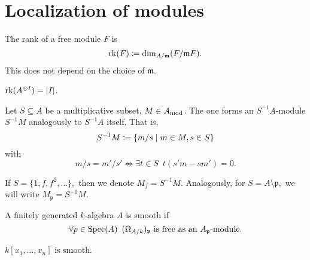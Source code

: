 \section{Localization of modules}

\begin{df}
  The rank of a free module $F$ is
  \[ \operatorname*{rk}(F) \coloneqq \dim_{A/{\mathfrak{m}}}(F / {\mathfrak m F}).\]
  This does not depend on the choice of $\mathfrak m$.
\end{df}

\begin{example}
  $ \operatorname*{rk}(A^{\oplus I}) = \lvert I\rvert$.
\end{example}

\begin{df}
  Let $S \subseteq A$ be a multiplicative subset, $M \in {A}_\mathrm{mod}$. The one forms an $S^{-1}A$-module $S^{-1}M$ analogously to $S^{-1}A$ itself. That is,
  \[ S^{-1}M \coloneqq \{ m / {s} \mathrel{|} m \in M, s \in S\}\]
  with
  \[ m / {s} = m' / {s'} \iff \exists t \in S \enspace t(s'm - sm') = 0.\]
\end{df}

\begin{example}
  If
  \( S = \{1, f, f^2, \dotsc \},\)
  then we denote
  \( M_f = S^{-1}M.\)
  Analogously, for
  \( S = A \setminus \mathfrak p,\)
  we will write
  \(M_{\mathfrak p} = S^{-1}M.\)
\end{example}

\begin{df}
  A finitely generated $k$-algebra $A$ is smooth if
  \[ \forall p \in \text{Spec}(A) \enspace (\Omega_{A/{k}})_{\mathfrak p} \text{ is free as an $A_{\mathfrak p}$-module}.\]
\end{df}


\begin{example}
  $k[x_1, \dotsc, x_n]$ is smooth.
\end{example}


